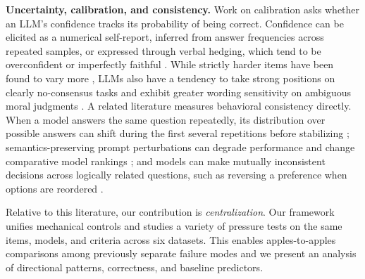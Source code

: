 \textbf{Uncertainty, calibration, and consistency.} Work on calibration asks whether an LLM's confidence tracks its
probability of being correct. Confidence can be elicited as a numerical self-report, inferred from answer frequencies
across repeated samples, or expressed through verbal hedging, which tend to be overconfident or imperfectly faithful
\citep{xiong2024confidence,wei2024simpleqa,yona2024faithful}. While strictly harder items have been found to vary more \citep{huang2025irt},
LLMs also have a tendency to take strong positions on clearly no-consensus tasks \citep{radharapu2025arbiters} and exhibit
greater wording sensitivity on ambiguous moral judgments \citep{scherrer2023moral}. A related literature measures behavioral consistency directly.
When a model answers the same question repeatedly, its distribution over possible answers can shift during the first several repetitions before stabilizing \citep{kim2026drift};
semantics-preserving prompt perturbations can degrade performance and change comparative model rankings \citep{romanou2026brittlebench}; and
models can make mutually inconsistent decisions across logically related questions, such as reversing a preference when options are reordered \citep{liu2025logic}.

Relative to this literature, our contribution is \emph{centralization}. Our framework unifies mechanical controls and studies a variety of pressure tests on the
same items, models, and criteria across six datasets. This enables apples-to-apples comparisons among previously separate 
failure modes and we present an analysis of directional patterns, correctness, and baseline predictors.
